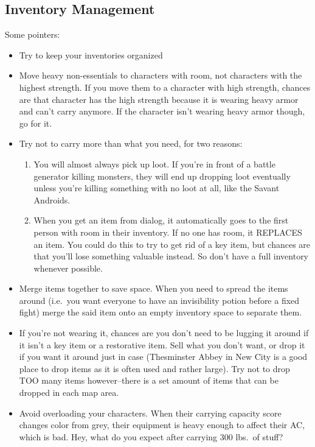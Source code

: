\documentclass[12pt]{article}
\providecommand{\tightlist}{%
  \setlength{\itemsep}{0pt}\setlength{\parskip}{0pt}}
\begin{document}
\subsection{Inventory Management}\label{inventory-management}

Some pointers:

\begin{itemize}
\tightlist
\item
  Try to keep your inventories organized
\item
  Move heavy non-essentials to characters with room, not characters with
  the highest strength. If you move them to a character with high
  strength, chances are that character has the high strength because it
  is wearing heavy armor and can't carry anymore. If the character isn't
  wearing heavy armor though, go for it.
\item
  Try not to carry more than what you need, for two reasons:

  \begin{enumerate}
  \def\labelenumi{\arabic{enumi}.}
  \tightlist
  \item
    You will almost always pick up loot. If you're in front of a battle
    generator killing monsters, they will end up dropping loot
    eventually unless you're killing something with no loot at all, like
    the Savant Androids.
  \item
    When you get an item from dialog, it automatically goes to the first
    person with room in their inventory. If no one has room, it REPLACES
    an item. You could do this to try to get rid of a key item, but
    chances are that you'll lose something valuable instead. So don't
    have a full inventory whenever possible.
  \end{enumerate}
\item
  Merge items together to save space. When you need to spread the items
  around (i.e.~you want everyone to have an invisibility potion before a
  fixed fight) merge the said item onto an empty inventory space to
  separate them.
\item
  If you're not wearing it, chances are you don't need to be lugging it
  around if it isn't a key item or a restorative item. Sell what you
  don't want, or drop it if you want it around just in case (Thesminster
  Abbey in New City is a good place to drop items as it is often used
  and rather large). Try not to drop TOO many items however--there is a
  set amount of items that can be dropped in each map area.
\item
  Avoid overloading your characters. When their carrying capacity score
  changes color from grey, their equipment is heavy enough to affect
  their AC, which is bad. Hey, what do you expect after carrying 300
  lbs.\ of stuff?
\end{itemize}
\end{document}
